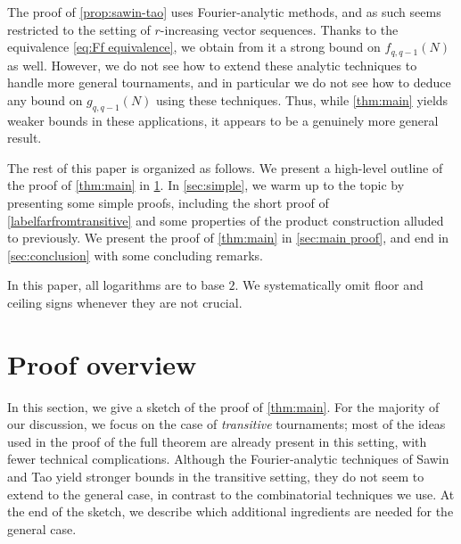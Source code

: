 \documentclass[11pt,reqno]{amsart}
\theoremstyle{definition}
\newcommand\1{\mathbf{1}}
\begin{document}
The proof of \cref{prop:sawin-tao} uses Fourier-analytic methods, and as such seems restricted to the setting of $r$-increasing vector sequences. Thanks to the equivalence \eqref{eq:Ff equivalence}, we obtain from it a strong bound on $f_{q,q-1}(N)$ as well. However, we do not see how to extend these analytic techniques to handle more general tournaments, and in particular we do not see how to deduce any bound on $g_{q,q-1}(N)$ using these techniques. Thus, while \cref{thm:main} yields weaker bounds in these applications, it appears to be a genuinely more general result.




The rest of this paper is organized as follows. We present a high-level outline of the proof of \cref{thm:main} in \cref{sec:overview}. In \cref{sec:simple}, we warm up to the topic by presenting some simple proofs, including the short proof of \cref{labelfarfromtransitive} and some properties of the product construction alluded to previously. We present the proof of \cref{thm:main} in \cref{sec:main proof}, and end in \cref{sec:conclusion} with some concluding remarks. 

In this paper, all logarithms are to base $2$. We systematically omit floor and ceiling signs whenever they are not crucial.


\section{Proof overview}\label{sec:overview}
In this section, we give a sketch of the proof of \cref{thm:main}. For the majority of our discussion, we focus on the case of \emph{transitive} tournaments; most of the ideas used in the proof of the full theorem are already present in this setting, with fewer technical complications. Although the Fourier-analytic techniques of Sawin and Tao yield stronger bounds in the transitive setting, they do not seem to extend to the general case, in contrast to the combinatorial techniques we use. At the end of the sketch, we describe which additional ingredients are needed for the general case.
\end{document}
